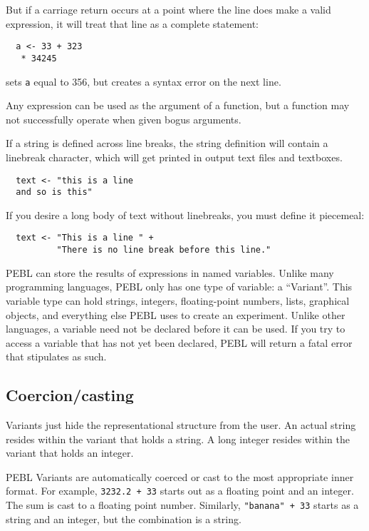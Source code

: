 But if a carriage return occurs at a point where the
line does make a valid expression, it will treat that line as a complete statement:
\begin{verbatim}
  a <- 33 + 323
   * 34245
\end{verbatim}
sets \texttt{a} equal to 356, but creates a syntax error on the next line.

Any expression can be used as the argument of a function, but a
function may not successfully operate when given bogus arguments.


If a string is defined across line breaks, the string definition will
contain a linebreak character, which will get printed in output text
files and textboxes.

\begin{verbatim}
  text <- "this is a line
  and so is this"
\end{verbatim}
If you desire a long body of text without linebreaks, you must define it piecemeal:
\begin{verbatim}
  text <- "This is a line " +
          "There is no line break before this line."
\end{verbatim}



\vfill
{}

PEBL can store the results of expressions in
named variables.  Unlike many programming languages, PEBL
only has one type of variable: a ``Variant''. This variable
type can hold strings, integers, floating-point numbers, lists,
graphical objects, and everything else PEBL uses to create an
experiment.  Unlike other languages, a variable need not be
declared before it can be used.  If you try to access a variable that
has not yet been declared, PEBL will return a fatal error that stipulates as such.


\subsection{Coercion/casting}

Variants  just hide the representational structure
from the user. An actual string resides within the variant that holds a string. A long integer resides within the variant that holds an integer.

PEBL Variants are automatically coerced or cast to the
most appropriate inner format.  For example, \texttt{3232.2 + 33}
starts out as a floating point and an integer.  The sum is
cast to a floating point number. Similarly, \texttt{"banana" + 33}
starts as a string and an integer, but the combination is a string.


